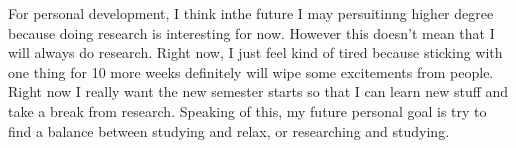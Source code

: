 \documentclass{article}
\begin{document}
For personal development, I think inthe future I may persuitinng higher degree because doing research
is interesting for now. However this doesn't mean that I will always do research.
Right now, I just feel kind of tired because sticking with one thing for 10 more weeks definitely will wipe some excitements from people.
Right now I really want the new semester starts so that I can learn new stuff and take a break from research.
Speaking of this, my future personal goal is try to find a balance between studying and relax, or researching and studying.

\cite{1}


\end{document}
